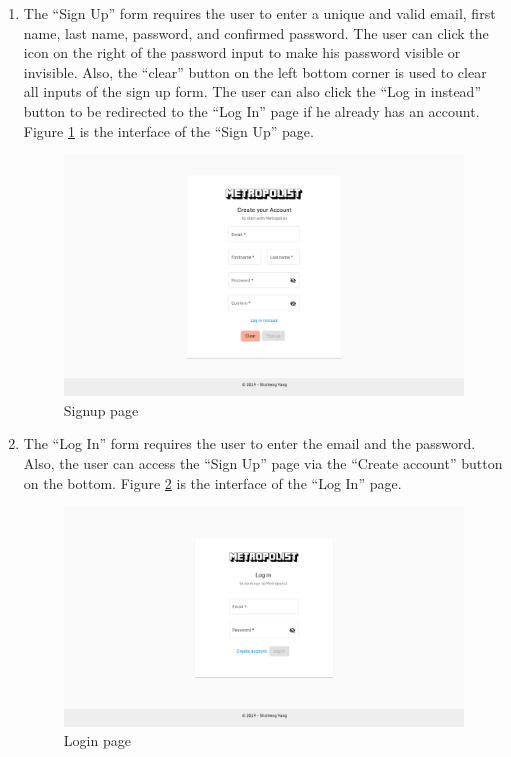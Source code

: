 \begin{enumerate}
  \item The ``Sign Up'' form requires the user to enter a unique and valid email, first name, last name, password, and confirmed password. The user can click the icon on the right of the password input to make his password visible or invisible. Also, the ``clear'' button on the left bottom corner is used to clear all inputs of the sign up form. The user can also click the ``Log in instead'' button to be redirected to the ``Log In'' page if he already has an account. Figure \ref{fig:GUI signup} is the interface of the ``Sign Up'' page.

  \begin{figure}[htbp]
    \includegraphics[width=\textwidth]{section04/assets/GUI-signup.png}
    \caption{Signup page}
    \label{fig:GUI signup}
  \end{figure}

  \item The ``Log In'' form requires the user to enter the email and the password. Also, the user can access the ``Sign Up'' page via the ``Create account'' button on the bottom. Figure \ref{fig:GUI login} is the interface of the ``Log In'' page.

  \begin{figure}[htbp]
    \includegraphics[width=\textwidth]{section04/assets/GUI-login.png}
    \caption{Login page}
    \label{fig:GUI login}
  \end{figure}


\end{enumerate}
